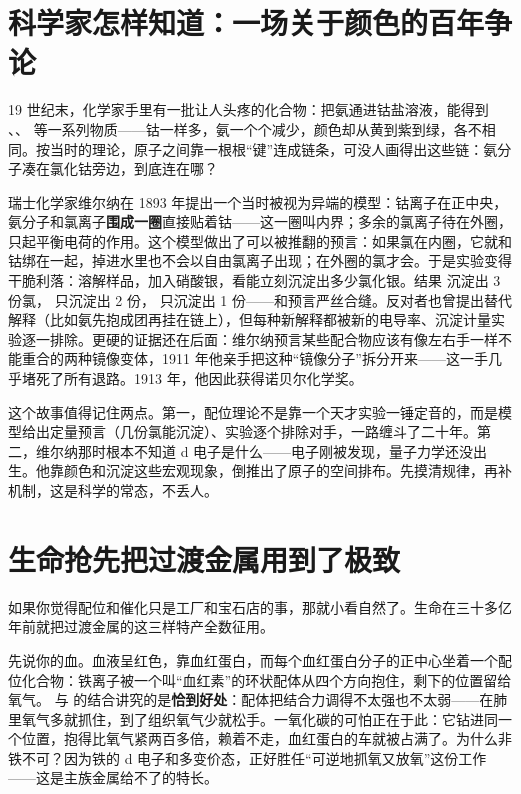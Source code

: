 \section{科学家怎样知道：一场关于颜色的百年争论}

\begin{zhengju}
19 世纪末，化学家手里有一批让人头疼的化合物：把氨通进钴盐溶液，能得到 、、 等一系列物质——钴一样多，氨一个个减少，颜色却从黄到紫到绿，各不相同。按当时的理论，原子之间靠一根根“键”连成链条，可没人画得出这些链：氨分子凑在氯化钴旁边，到底连在哪？

瑞士化学家维尔纳在 1893 年提出一个当时被视为异端的模型：钴离子在正中央，氨分子和氯离子\textbf{围成一圈}直接贴着钴——这一圈叫内界；多余的氯离子待在外圈，只起平衡电荷的作用。这个模型做出了可以被推翻的预言：如果氯在内圈，它就和钴绑在一起，掉进水里也不会以自由氯离子出现；在外圈的氯才会。于是实验变得干脆利落：溶解样品，加入硝酸银，看能立刻沉淀出多少氯化银。结果  沉淀出 3 份氯， 只沉淀出 2 份， 只沉淀出 1 份——和预言严丝合缝。反对者也曾提出替代解释（比如氨先抱成团再挂在链上），但每种新解释都被新的电导率、沉淀计量实验逐一排除。更硬的证据还在后面：维尔纳预言某些配合物应该有像左右手一样不能重合的两种镜像变体，1911 年他亲手把这种“镜像分子”拆分开来——这一手几乎堵死了所有退路。1913 年，他因此获得诺贝尔化学奖。

这个故事值得记住两点。第一，配位理论不是靠一个天才实验一锤定音的，而是模型给出定量预言（几份氯能沉淀）、实验逐个排除对手，一路缠斗了二十年。第二，维尔纳那时根本不知道 d 电子是什么——电子刚被发现，量子力学还没出生。他靠颜色和沉淀这些宏观现象，倒推出了原子的空间排布。先摸清规律，再补机制，这是科学的常态，不丢人。
\end{zhengju}

\section{生命抢先把过渡金属用到了极致}

如果你觉得配位和催化只是工厂和宝石店的事，那就小看自然了。生命在三十多亿年前就把过渡金属的这三样特产全数征用。

先说你的血。血液呈红色，靠血红蛋白，而每个血红蛋白分子的正中心坐着一个配位化合物：铁离子被一个叫“血红素”的环状配体从四个方向抱住，剩下的位置留给氧气。 与  的结合讲究的是\textbf{恰到好处}：配体把结合力调得不太强也不太弱——在肺里氧气多就抓住，到了组织氧气少就松手。一氧化碳的可怕正在于此：它钻进同一个位置，抱得比氧气紧两百多倍，赖着不走，血红蛋白的车就被占满了。为什么非铁不可？因为铁的 d 电子和多变价态，正好胜任“可逆地抓氧又放氧”这份工作——这是主族金属给不了的特长。

